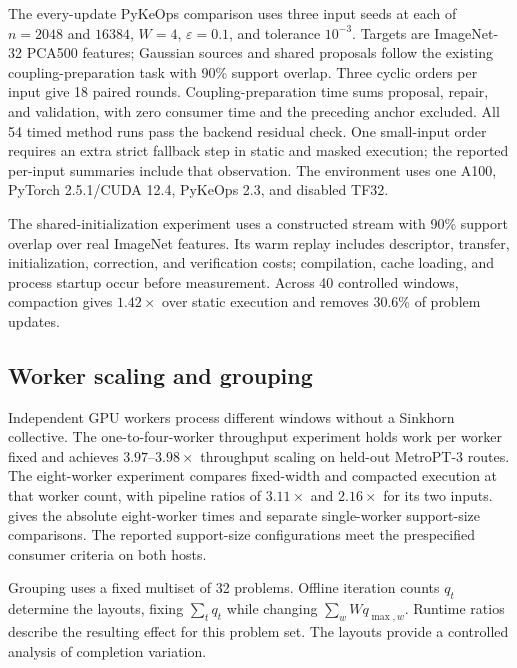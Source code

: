 The every-update PyKeOps comparison uses three input seeds at each of $n=2048$ and $16384$, $W=4$, $\varepsilon=0.1$, and tolerance $10^{-3}$. Targets are ImageNet-32 PCA500 features; Gaussian sources and shared proposals follow the existing coupling-preparation task with 90\% support overlap. Three cyclic orders per input give 18 paired rounds. Coupling-preparation time sums proposal, repair, and validation, with zero consumer time and the preceding anchor excluded. All 54 timed method runs pass the backend residual check. One small-input order requires an extra strict fallback step in static and masked execution; the reported per-input summaries include that observation. The environment uses one A100, PyTorch 2.5.1/CUDA 12.4, PyKeOps 2.3, and disabled TF32.

The shared-initialization experiment uses a constructed stream with 90\% support overlap over real ImageNet features. Its warm replay includes descriptor, transfer, initialization, correction, and verification costs; compilation, cache loading, and process startup occur before measurement. Across 40 controlled windows, compaction gives $1.42\times$ over static execution and removes 30.6\% of problem updates.

\subsection{Worker scaling and grouping}
\label{sec:worker-details}

Independent GPU workers process different windows without a Sinkhorn collective. The one-to-four-worker throughput experiment holds work per worker fixed and achieves $3.97$--$3.98\times$ throughput scaling on held-out MetroPT-3 routes. The eight-worker experiment compares fixed-width and compacted execution at that worker count, with pipeline ratios of $3.11\times$ and $2.16\times$ for its two inputs.  gives the absolute eight-worker times and separate single-worker support-size comparisons. The reported support-size configurations meet the prespecified consumer criteria on both hosts.



Grouping uses a fixed multiset of 32 problems. Offline iteration counts $q_t$ determine the layouts, fixing $\sum_t q_t$ while changing $\sum_w Wq_{\max,w}$. Runtime ratios describe the resulting effect for this problem set. The layouts provide a controlled analysis of completion variation.


